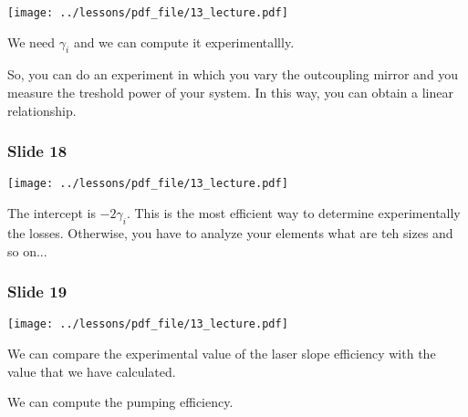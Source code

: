 \documentclass[../main/main.tex]{subfiles}
\begin{document}
\begin{minipage}[]{0.5\linewidth}
\centering
\texttt{[image: ../lessons/pdf\_file/13\_lecture.pdf]}
\end{minipage}
\hspace{0.3cm}\vspace{0.3cm}
\begin{minipage}[c]{0.47\linewidth}

We need \( \gamma _i  \) and we can compute it experimentallly.

So, you can do an experiment in which you vary the outcoupling mirror and you measure the treshold power of your system. In this way, you can obtain a linear relationship.

\end{minipage}

\subsubsection*{Slide 18}

\begin{minipage}[]{0.5\linewidth}
\centering
\texttt{[image: ../lessons/pdf\_file/13\_lecture.pdf]}
\end{minipage}
\hspace{0.3cm}\vspace{0.3cm}
\begin{minipage}[c]{0.47\linewidth}

The intercept is \( -2 \gamma _i  \). This is the most efficient way to determine experimentally the losses. Otherwise, you have to analyze your elements what are teh sizes and so on...

\end{minipage}

\subsubsection*{Slide 19}

\begin{minipage}[]{0.5\linewidth}
\centering
\texttt{[image: ../lessons/pdf\_file/13\_lecture.pdf]}
\end{minipage}
\hspace{0.3cm}\vspace{0.3cm}
\begin{minipage}[c]{0.47\linewidth}

We can compare the experimental value of the laser slope efficiency with the value that we have calculated.

We can compute the pumping efficiency.

\end{minipage}
\end{document}
